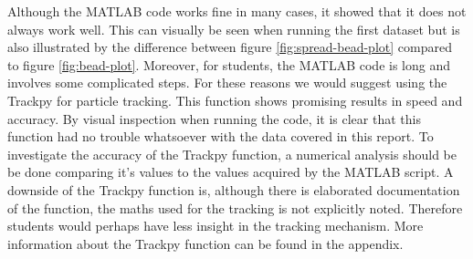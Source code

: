 Although the MATLAB code works fine in many cases, it showed that it does not always work well. This can visually be seen when running the first dataset but is also illustrated by the difference between figure \ref{fig:spread-bead-plot} compared to figure \ref{fig:bead-plot}. Moreover, for students, the MATLAB code is long and involves some complicated steps. For these reasons we would suggest using the Trackpy for particle tracking. This function shows promising results in speed and accuracy. By visual inspection when running the code, it is clear that this function had no trouble whatsoever with the data covered in this report. To investigate the accuracy of the Trackpy function, a numerical analysis should be be done comparing it's values to the values acquired by the MATLAB script. A downside of the Trackpy function is, although there is elaborated documentation of the function, the maths used for the tracking is not explicitly noted. Therefore students would perhaps have less insight in the tracking mechanism. More information about the Trackpy function can be found in the appendix.
